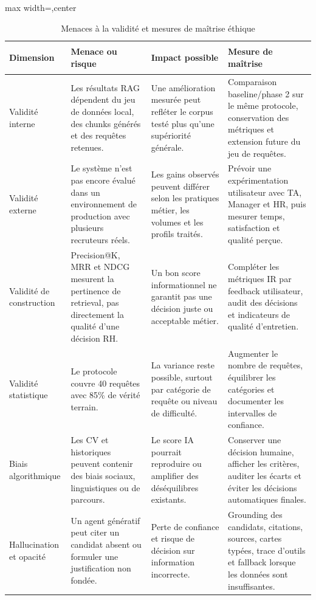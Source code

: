 \begin{table}[H]
  \centering
  \scriptsize
  \caption{\label{tab:validity-ethics-risks}Menaces à la validité et mesures de maîtrise éthique}
  \begin{adjustbox}{max width=\linewidth,center}
  \begin{tabularx}{\textwidth}{>{\bfseries\raggedright\arraybackslash}p{2.6cm}>{\raggedright\arraybackslash}X>{\raggedright\arraybackslash}X>{\raggedright\arraybackslash}X}
    \toprule
    Dimension & Menace ou risque & Impact possible & Mesure de maîtrise \\
    \midrule
    Validité interne & Les résultats RAG dépendent du jeu de données local, des chunks générés et des requêtes retenues. & Une amélioration mesurée peut refléter le corpus testé plus qu'une supériorité générale. & Comparaison baseline/phase 2 sur le même protocole, conservation des métriques et extension future du jeu de requêtes. \\
    Validité externe & Le système n'est pas encore évalué dans un environnement de production avec plusieurs recruteurs réels. & Les gains observés peuvent différer selon les pratiques métier, les volumes et les profils traités. & Prévoir une expérimentation utilisateur avec TA, Manager et HR, puis mesurer temps, satisfaction et qualité perçue. \\
    Validité de construction & Precision@K, MRR et NDCG mesurent la pertinence de retrieval, pas directement la qualité d'une décision RH. & Un bon score informationnel ne garantit pas une décision juste ou acceptable métier. & Compléter les métriques IR par feedback utilisateur, audit des décisions et indicateurs de qualité d'entretien. \\
    Validité statistique & Le protocole couvre 40 requêtes avec 85\% de vérité terrain. & La variance reste possible, surtout par catégorie de requête ou niveau de difficulté. & Augmenter le nombre de requêtes, équilibrer les catégories et documenter les intervalles de confiance. \\
    Biais algorithmique & Les CV et historiques peuvent contenir des biais sociaux, linguistiques ou de parcours. & Le score IA pourrait reproduire ou amplifier des déséquilibres existants. & Conserver une décision humaine, afficher les critères, auditer les écarts et éviter les décisions automatiques finales. \\
    Hallucination et opacité & Un agent génératif peut citer un candidat absent ou formuler une justification non fondée. & Perte de confiance et risque de décision sur information incorrecte. & Grounding des candidats, citations, sources, cartes typées, trace d'outils et fallback lorsque les données sont insuffisantes. \\

\end{tabularx}
\end{adjustbox}
\end{table}
